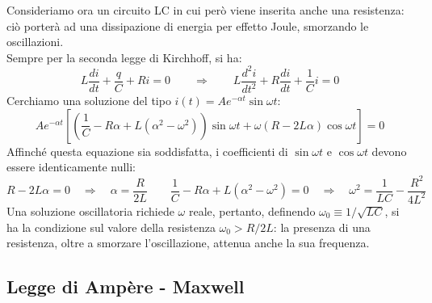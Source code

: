 Consideriamo ora un circuito LC in cui però viene inserita anche una resistenza: ciò porterà ad una dissipazione di energia per effetto Joule, smorzando le oscillazioni. \\ 
Sempre per la seconda legge di Kirchhoff, si ha:
\begin{equation}
	L \frac{di}{dt} + \frac{q}{C} + Ri = 0 \qquad\Longrightarrow\qquad L \frac{d^2 i}{dt^2} + R \frac{di}{dt} + \frac{1}{C} i = 0
	\label{eq:43}
\end{equation}
Cerchiamo una soluzione del tipo $ i(t) = A e^{-\alpha t} \sin\omega t $:
\begin{equation}
	A e^{-\alpha t} \left[ \left( \frac{1}{C} - R\alpha + L(\alpha^2 - \omega^2)\right) \sin\omega t + \omega (R - 2L\alpha) \cos\omega t \right] = 0
	\label{eq:44}
\end{equation}
Affinché questa equazione sia soddisfatta, i coefficienti di $ \sin\omega t $ e $ \cos\omega t $ devono essere identicamente nulli:
\begin{equation}
	R - 2L\alpha = 0 \quad\Rightarrow\quad \alpha = \frac{R}{2L} \qquad \frac{1}{C} - R\alpha + L (\alpha^2 - \omega^2) = 0 \quad\Rightarrow\quad \omega^2 = \frac{1}{LC} - \frac{R^2}{4L^2}
	\label{eq:45}
\end{equation}
Una soluzione oscillatoria richiede $ \omega $ reale, pertanto, definendo $ \omega_0 \equiv 1 / \sqrt{LC} $, si ha la condizione sul valore della resistenza $ \omega_0 > R / 2L $: la presenza di una resistenza, oltre a smorzare l'oscillazione, attenua anche la sua frequenza.

\subsection{Legge di Ampère - Maxwell}

